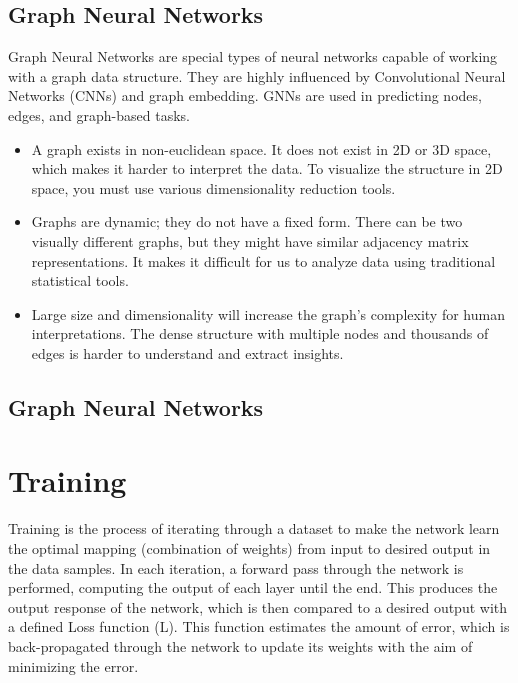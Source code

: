 \subsection{Graph Neural Networks}
\label{subsec:3_gnns}

Graph Neural Networks are special types of neural networks capable of working with a graph data structure. They are highly influenced by Convolutional Neural Networks (CNNs) and graph embedding. GNNs are used in predicting nodes, edges, and graph-based tasks. 

\begin{itemize}
	\item A graph exists in non-euclidean space. It does not exist in 2D or 3D space, which makes it harder to interpret the data. To visualize the structure in 2D space, you must use various dimensionality reduction tools.
	\item Graphs are dynamic; they do not have a fixed form. There can be two visually different graphs, but they might have similar adjacency matrix representations. It makes it difficult for us to analyze data using traditional statistical tools.
	\item Large size and dimensionality will increase the graph's complexity for human interpretations. The dense structure with multiple nodes and thousands of edges is harder to understand and extract insights. 
\end{itemize}

\subsection{Graph Neural Networks}
\label{subsec:3_gnns}


\section{Training}
\label{sec:3_training}

Training is the process of iterating through a dataset to make the network learn the optimal mapping (combination of weights) from input to desired output in the data samples. In each iteration, a forward pass through the network is performed, computing the output of each layer until the end. This produces the output response of the network, which is then compared to a desired output with a defined Loss function (L). This function estimates the amount of error, which is back-propagated through the network to update its weights with the aim of minimizing the error. 

